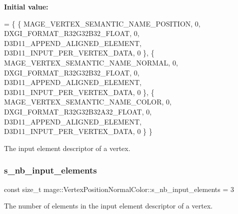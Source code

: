 {\bfseries Initial value\+:}
\begin{DoxyCode}
= \{
        \{ MAGE\_VERTEX\_SEMANTIC\_NAME\_POSITION, 0, DXGI\_FORMAT\_R32G32B32\_FLOAT,    0, 
      D3D11\_APPEND\_ALIGNED\_ELEMENT, D3D11\_INPUT\_PER\_VERTEX\_DATA, 0 \},
        \{ MAGE\_VERTEX\_SEMANTIC\_NAME\_NORMAL,   0, DXGI\_FORMAT\_R32G32B32\_FLOAT,    0, 
      D3D11\_APPEND\_ALIGNED\_ELEMENT, D3D11\_INPUT\_PER\_VERTEX\_DATA, 0 \},
        \{ MAGE\_VERTEX\_SEMANTIC\_NAME\_COLOR,    0, DXGI\_FORMAT\_R32G32B32A32\_FLOAT, 0, 
      D3D11\_APPEND\_ALIGNED\_ELEMENT, D3D11\_INPUT\_PER\_VERTEX\_DATA, 0 \}
    \}
\end{DoxyCode}
The input element descriptor of a vertex. \hypertarget{structmage_1_1_vertex_position_normal_color_ac370f25c8a65c6ed0522b84710acd713}{}\label{structmage_1_1_vertex_position_normal_color_ac370f25c8a65c6ed0522b84710acd713} 
\subsubsection{\texorpdfstring{s\+\_\+nb\+\_\+input\+\_\+elements}{s\_nb\_input\_elements}}
{\footnotesize\ttfamily const size\+\_\+t mage\+::\+Vertex\+Position\+Normal\+Color\+::s\+\_\+nb\+\_\+input\+\_\+elements = 3\hspace{0.3cm}{\ttfamily [static]}}

The number of elements in the input element descriptor of a vertex. 